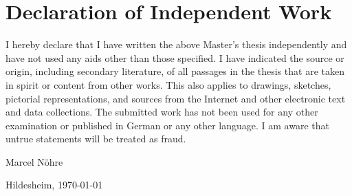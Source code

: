 \documentclass[11pt,        %
  ngerman,english,          %
  paper=a4,                 %
  captions=tablesignature,  %
  listof=numbered,          %
  bibliography=totoc,       %
  headings=small,           %
  headinclude=false,        %
  footinclude=false,        %
  parskip=half-,            %
  oneside,                  %
  BCOR=15mm,                %
  DIV=12                    %
  ]{scrbook}                %
\begin{document}
\chapter*{Declaration of Independent Work}
\thispagestyle{empty}
  {
    I hereby declare that I have written the above Master's thesis independently
    and have not used any aids other than those specified. I have indicated the 
    source or origin, including secondary literature, of all passages in the thesis 
    that are taken in spirit or content from other works. This also applies to 
    drawings, sketches, pictorial representations, and sources from the Internet 
    and other electronic text and data collections. The submitted work has not 
    been used for any other examination or published in German or any other 
    language. I am aware that untrue statements will be treated as fraud.
  }


\vspace*{4cm}

Marcel Nöhre

\vspace*{1cm}

Hildesheim, \today
\end{document}

